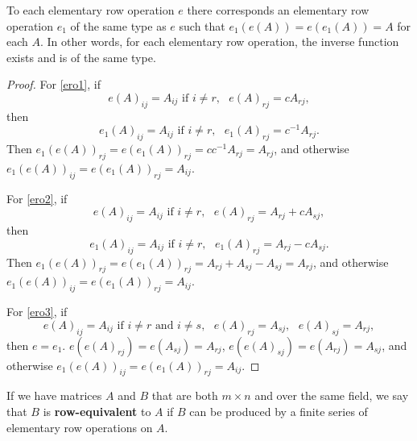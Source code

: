 \documentclass[12pt]{article}
\begin{document}
\begin{thm} \label{thm:elrowinv}
  To each elementary row operation $e$ there corresponds an
  elementary row operation $e_1$ of the same type as $e$ such
  that $e_1(e(A)) = e(e_1(A)) = A$ for each $A$. In other words,
  for each elementary row operation, the inverse function exists
  and is of the same type.
  \begin{proof}
    For \eqref{ero1}, if
      \begin{equation*}
        e(A)_{ij} = A_{ij} \text{ if } i \neq r,\text{ }e(A)_{rj}
        = cA_{rj},
      \end{equation*}
    then
      \begin{equation*}
        e_{1}(A)_{ij} = A_{ij} \text{ if } i \neq r,\text{ }e_{1}(A)_{rj}
        = c^{-1}A_{rj}.
      \end{equation*}
    Then $e_{1}(e(A))_{rj} = e(e_{1}(A))_{rj} = cc^{-1}A_{rj} =
    A_{rj}$, and otherwise $e_{1}(e(A))_{ij} = e(e_{1}(A))_{rj} =
    A_{ij}$.

    For \eqref{ero2}, if
      \begin{equation*}
        e(A)_{ij} = A_{ij} \text{ if } i \neq r,\text{ }e(A)_{rj} =
        A_{rj} + cA_{sj},
      \end{equation*}
    then
      \begin{equation*}
        e_{1}(A)_{ij} = A_{ij} \text{ if } i \neq r,\text{ }e_{1}(A)_{rj} =
        A_{rj} - cA_{sj}.
      \end{equation*}
    Then $e_{1}(e(A))_{rj} = e(e_{1}(A))_{rj} = A_{rj} + A_{sj} -
    A_{sj} = A_{rj}$, and otherwise $e_{1}(e(A))_{ij} =
    e(e_{1}(A))_{rj} = A_{ij}$.

    For \eqref{ero3}, if
      \begin{equation*}
        e(A)_{ij} = A_{ij} \text{ if } i \neq r \text{ and } i
        \neq s,\text{ }e(A)_{rj} = A_{sj},\text{ }e(A)_{sj} = A_{rj},
      \end{equation*}
    then $e = e_{1}$. $e(e(A)_{rj}) = e(A_{sj}) = A_{rj}$,
    $e(e(A)_{sj}) = e(A_{rj}) = A_{sj}$, and otherwise
    $e_{1}(e(A))_{ij} = e(e_{1}(A))_{rj} = A_{ij}$.
  \end{proof}

\end{thm}

\begin{defn}
  If we have matrices $A$ and $B$ that are both $m \times n$ and
  over the same field, we say that $B$ is \textbf{row-equivalent}
  to $A$ if $B$ can be produced by a finite series of elementary
  row operations on $A$.
\end{defn}
\end{document}
